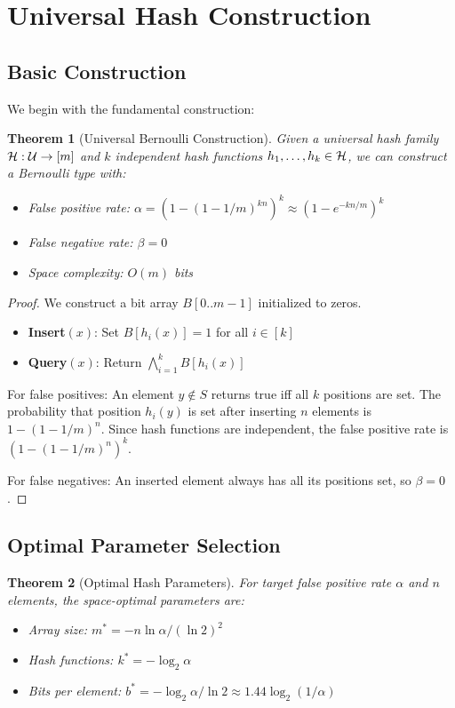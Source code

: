 \documentclass[11pt]{article}
\newtheorem{theorem}{Theorem}
\begin{document}
\section{Universal Hash Construction}

\subsection{Basic Construction}

We begin with the fundamental construction:

\begin{theorem}[Universal Bernoulli Construction]
Given a universal hash family $\mathcal{H}: \mathcal{U} \to [m]$ and $k$ independent hash functions $h_1, \ldots, h_k \in \mathcal{H}$, we can construct a Bernoulli type with:
\begin{itemize}
\item False positive rate: $\alpha = (1 - (1 - 1/m)^{kn})^k \approx (1 - e^{-kn/m})^k$
\item False negative rate: $\beta = 0$
\item Space complexity: $O(m)$ bits
\end{itemize}
\end{theorem}

\begin{proof}
We construct a bit array $B[0..m-1]$ initialized to zeros.
\begin{itemize}
\item \textbf{Insert}$(x)$: Set $B[h_i(x)] = 1$ for all $i \in [k]$
\item \textbf{Query}$(x)$: Return $\bigwedge_{i=1}^k B[h_i(x)]$
\end{itemize}

For false positives: An element $y \notin S$ returns true iff all $k$ positions are set. The probability that position $h_i(y)$ is set after inserting $n$ elements is $1 - (1 - 1/m)^n$. Since hash functions are independent, the false positive rate is $(1 - (1 - 1/m)^n)^k$.

For false negatives: An inserted element always has all its positions set, so $\beta = 0$.
\end{proof}

\subsection{Optimal Parameter Selection}

\begin{theorem}[Optimal Hash Parameters]
For target false positive rate $\alpha$ and $n$ elements, the space-optimal parameters are:
\begin{itemize}
\item Array size: $m^* = -n \ln \alpha / (\ln 2)^2$
\item Hash functions: $k^* = -\log_2 \alpha$
\item Bits per element: $b^* = -\log_2 \alpha / \ln 2 \approx 1.44 \log_2(1/\alpha)$
\end{itemize}
\end{theorem}
\end{document}
